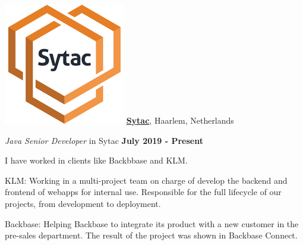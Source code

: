 \includegraphics[scale=0.1]{companies/sytac} \href{https://www.sytac.op/}{\textbf{Sytac}},
Haarlem, Netherlands
\begin{outerlist}
\item[] \textit{Java Senior Developer} in Sytac%
        \hfill \textbf{July 2019 - Present}

I have worked in clients like Backbbase and KLM\@.
\begin{innerlist}
\item KLM: Working in a multi-project team on charge of develop the backend and frontend of webapps for internal use. Responsible for the full lifecycle of our projects, from development to deployment.

\item Backbase: Helping Backbase to integrate its product with a new customer in the pre-sales department. The result of the project was shown in Backbase Connect.

\end{innerlist}

\end{outerlist}

